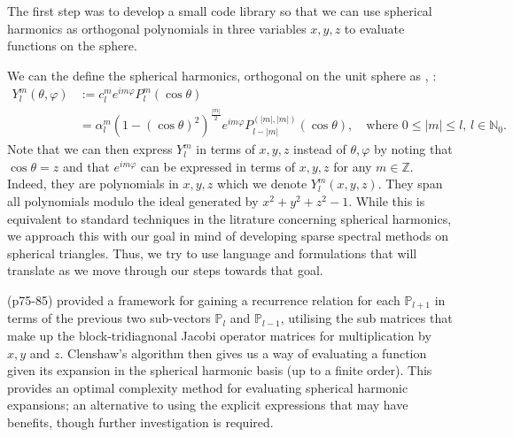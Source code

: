 \documentclass[11pt, oneside]{article}   	%
\newcommand{\No}{\mathbb{N}_0}
\newcommand{\Ylm}{Y^m_l}
\newcommand{\Ylmfull}{Y^m_l(\theta,\varphi)}
\newcommand{\Plm}{\jac^m_l}
\newcommand{\costheta}{\cos\theta}
\newcommand{\eimphi}{e^{im\varphi}}
\newcommand{\alphalm}{\alpha^m_l}
\newcommand{\clm}{c^m_l}
\newcommand{\bigP}{\mathbb{P}}
\newcommand{\Pl}{\mathbb{P}_l}
\newcommand{\jac}{{P}}
\begin{document}
The first step was to develop a small code library so that we can use spherical harmonics as orthogonal polynomials in three variables $x, y, z$  to evaluate functions on the sphere. 

We can the define the spherical harmonics, orthogonal on the unit sphere as \cite{efthimiou2014spherical, dai2013approximation}, \cite[14.30.1, 14.3.1, 14.3.6]{DLMF}:
\begin{align}
\Ylmfull &:= \clm \eimphi \Plm (\costheta) \\
&= \alphalm (1 - (\costheta)^2)^\frac{|m|}{2} \eimphi P^{(|m|,|m|)}_{l-|m|}(\costheta), \quad \text{where } 0 \le |m| \le l, \, l \in \No.
\end{align} 
Note that we can then express \(\Ylm\) in terms of \(x,y,z\) instead of \(\theta, \varphi\) by noting that \(\costheta = z\) and that \( \eimphi\) can be expressed in terms of \(x,y,z\) for any \(m\in\mathbb{Z}\). Indeed, they are polynomials in $x,y,z$ which we denote $\Ylm(x,y,z)$. They span all polynomials modulo the ideal generated by $x^2 + y^2 + z^2 - 1$. While this is equivalent to standard techniques in the litrature concerning spherical harmonics, we approach this with our goal in mind of developing sparse spectral methods on spherical triangles. Thus, we try to use language and formulations that will translate as we move through our steps towards that goal.

\citep{dunkl2014orthogonal} (p75-85) provided a framework for gaining a recurrence relation for each \(\bigP_{l+1}\) in terms of the previous two sub-vectors \(\Pl\) and \(\bigP_{l-1}\), utilising the sub matrices that make up the block-tridiagnonal Jacobi operator matrices for multiplication by $x, y$ and $z$. Clenshaw's algorithm then gives us a way of evaluating a function given its expansion in the spherical harmonic basis (up to a finite order). This provides an optimal complexity method for evaluating spherical harmonic expansions; an alternative to using the explicit expressions that may have benefits, though further investigation is required.
\end{document}
